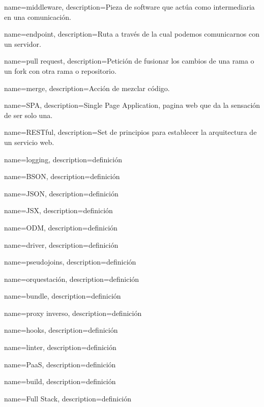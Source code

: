{
name={middleware},
description={Pieza de software que actúa como intermediaria en una comunicación.}
}

{
name={endpoint},
description={Ruta a través de la cual podemos comunicarnos con un servidor.}
}

{
name={pull request},
description={Petición de fusionar los cambios de una rama o un fork con otra rama o repositorio.}
}

{
name={merge},
description={Acción de mezclar código.}
}

{
name={SPA},
description={Single Page Application, pagina web que da la sensación de ser solo una.}
}

{
name={RESTful},
description={Set de principios para establecer la arquitectura de un servicio web.}
}

{
name={logging},
description={definición}
}

{
name={BSON},
description={definición}
}

{
name={JSON},
description={definición}
}

{
name={JSX},
description={definición}
}

{
name={ODM},
description={definición}
}

{
name={driver},
description={definición}
}

{
name={pseudojoins},
description={definición}
}

{
name={orquestación},
description={definición}
}

{
name={bundle},
description={definición}
}

{
name={proxy inverso},
description={definición}
}

{
name={hooks},
description={definición}
}

{
name={linter},
description={definición}
}

{
name={PaaS},
description={definición}
}

{
name={build},
description={definición}
}

{
name={Full Stack},
description={definición}
}
